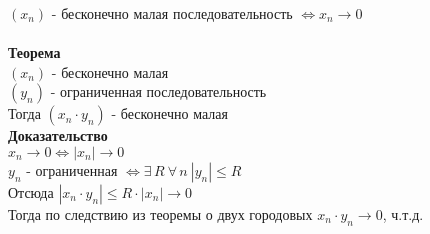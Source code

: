 \documentclass[12pt]{article}
\begin{document}
$(x_n)$ - бесконечно малая последовательность $\Leftrightarrow x_n \rightarrow 0$\\\\
\textbf{Теорема}\\
$(x_n)$ - бесконечно малая\\
$(y_n)$ - ограниченная последовательность\\
Тогда $(x_n\cdot y_n)$ - бесконечно малая\\
\textbf{Доказательство}\\
$x_n \rightarrow 0 \Leftrightarrow |x_n| \rightarrow 0$\\
$y_n$ - ограниченная $\Leftrightarrow \exists\,R\ \forall\,n\ |y_n|\leq R$\\
Отсюда $|x_n\cdot y_n| \leq R\cdot|x_n| \rightarrow 0$\\
Тогда по следствию из теоремы о двух городовых $x_n\cdot y_n \rightarrow 0$, ч.т.д.
\end{document}
